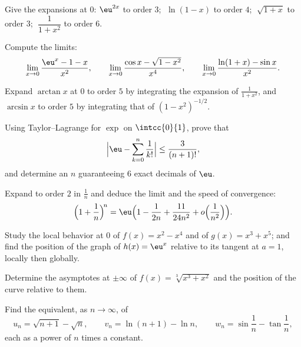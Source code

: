 \begin{exercise}[$\star$]\label{exo:b1:taylor:1}
Give the expansions at $0$: $\eu^{2x}$ to order $3$;
$\;\ln(1 - x)$ to order $4$; $\;\sqrt{1 + x}$ to order $3$;
$\;\dfrac{1}{1 + x^2}$ to order $6$.
\end{exercise}

\begin{exercise}[$\star$]\label{exo:b1:taylor:2}
Compute the limits:
\[
\lim_{x\to 0} \frac{\eu^x - 1 - x}{x^2},
\qquad
\lim_{x\to 0} \frac{\cos x - \sqrt{1 - x^2}}{x^4},
\qquad
\lim_{x\to 0} \frac{\ln(1+x) - \sin x}{x^2}.
\]
\end{exercise}

\begin{exercise}[$\star$]\label{exo:b1:taylor:3}
Expand $\arctan x$ at $0$ to order $5$ by integrating the expansion
of $\frac{1}{1 + x^2}$, and $\arcsin x$ to order $5$ by integrating
that of $(1 - x^2)^{-1/2}$.
\end{exercise}

\begin{exercise}[$\star$]\label{exo:b1:taylor:4}
Using Taylor--Lagrange for $\exp$ on $\intcc{0}{1}$, prove that
\[
\Bigl| \eu - \sum_{k=0}^{n} \frac{1}{k!} \Bigr| \leq
\frac{3}{(n+1)!},
\]
and determine an $n$ guaranteeing $6$ exact decimals of $\eu$.
\end{exercise}

\begin{exercise}[$\star\star$]\label{exo:b1:taylor:5}
Expand to order $2$ in $\frac1n$ and deduce the limit and the
speed of convergence:
\[
\Bigl(1 + \frac 1n\Bigr)^{\!n}
= \eu\Bigl(1 - \frac{1}{2n} + \frac{11}{24n^2} +
o\Bigl(\frac{1}{n^2}\Bigr)\Bigr).
\]
\end{exercise}

\begin{exercise}[$\star\star$]\label{exo:b1:taylor:6}
Study the local behavior at $0$ of $f(x) = x^2 - x^4$ and of $g(x) =
x^3 + x^5$; and find the position of the graph of $h(x) = \eu^x$
relative to its tangent at $a = 1$, locally then globally.
\end{exercise}

\begin{exercise}[$\star\star$]\label{exo:b1:taylor:7}
Determine the asymptotes at $\pm\infty$ of $f(x) =
\sqrt[3]{x^3 + x^2}$ and the position of the curve relative to
them.
\end{exercise}

\begin{exercise}[$\star\star$]\label{exo:b1:taylor:8}
Find the equivalent, as $n \to \infty$, of
\[
u_n = \sqrt{n+1} - \sqrt n, \qquad
v_n = \ln(n+1) - \ln n, \qquad
w_n = \sin\frac{1}{n} - \tan\frac{1}{n},
\]
each as a power of $n$ times a constant.
\end{exercise}

